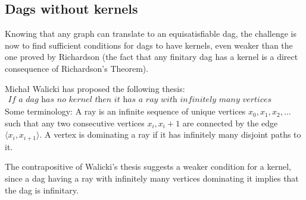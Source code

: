 
\subsection{Dags without kernels}
\label{sub:Dags without kernels}
Knowing that any graph can translate to an equisatisfiable dag, the challenge is now to find sufficient conditions for dags to have kernels, even weaker than the one proved by Richardson (the fact that any finitary dag has a kernel is a direct consequence of Richardson's Theorem).

Michał Walicki has proposed the following thesis:
\begin{align}
  \textit{If a dag has no kernel then it has a ray with infinitely many vertices dominating it.}
\end{align}
Some terminology:
A ray is an infinite sequence of unique vertices $x_0, x_1, x_2, \dots$ such that any two consecutive vertices $x_i,x_i+1$ are connected by the edge$\langle x_i,x_{i+1} \rangle$.
A vertex is dominating a ray if it has infinitely many disjoint paths to it.

The contrapositive of Walicki's thesis suggests a weaker condition for a kernel, since a dag having a ray with infinitely many vertices dominating it implies that the dag is infinitary.
